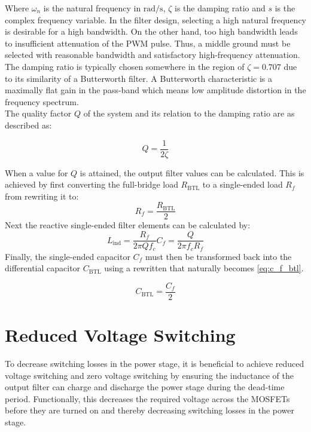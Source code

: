 Where $\omega_{n}$ is the natural frequency in $\si{\radian\per\second}$, $\zeta$ is the damping ratio and $s$ is the complex frequency variable. In the filter design, selecting a high natural frequency is desirable for a high bandwidth. On the other hand, too high bandwidth leads to insufficient attenuation of the PWM pulse. Thus, a middle ground must be selected with reasonable bandwidth and satisfactory high-frequency attenuation. 
The damping ratio is typically chosen somewhere in the region of $\zeta = 0.707$ due to its similarity of a Butterworth filter. A Butterworth characteristic is a maximally flat gain in the pass-band which means low amplitude distortion in the frequency spectrum. \\

The quality factor $Q$ of the system and its relation to the damping ratio are as described as:

\begin{equation} \label{eq:q_factor_zeta}
	Q = \frac{1}{2\zeta}
\end{equation}

When a value for $Q$ is attained, the output filter values can be calculated.
This is achieved by first converting the full-bridge load $R_{\mathrm{BTL}}$ to a single-ended load $R_{f}$ from  rewriting it to:
\begin{equation} \label{eq:r_f_btl}
	R_{f} = \frac{R_{\mathrm{BTL}}}{2}
\end{equation}
Next the reactive single-ended filter elements can be calculated by:
\begin{subequations} \label{eq:output_filter_se}
	\begin{equation} \label{eq:output_filter_l_ind}
		L_{\mathrm{ind}} = \frac{R_{f}}{2\pi Q f_{c}}
	\end{equation}
	\begin{equation} \label{eq:output_filter_c_f}
		C_{f} = \frac{Q}{2\pi f_{c} R_{f}}
	\end{equation}
\end{subequations}
Finally, the single-ended capacitor $C_{f}$ must then be transformed back into the differential capacitor $C_{\mathrm{BTL}}$ using a rewritten  that naturally becomes \autoref{eq:c_f_btl}.

\begin{equation} \label{eq:c_f_btl}
	C_{\mathrm{BTL}} = \frac{C_{f}}{2}
\end{equation}

\section{Reduced Voltage Switching}
To decrease switching losses in the power stage, it is beneficial to achieve reduced voltage switching and zero voltage switching by ensuring the inductance of the output filter can charge and discharge the power stage during the dead-time period. Functionally, this decreases the required voltage across the MOSFETs before they are turned on and thereby decreasing switching losses in the power stage.

